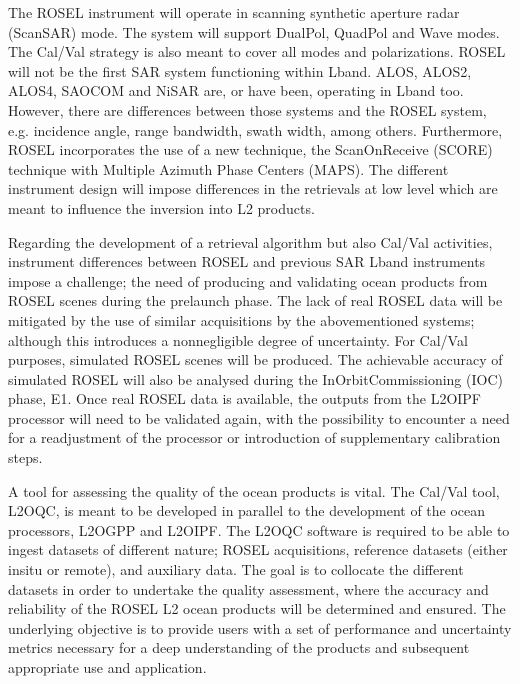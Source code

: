 \documentclass[a4paper,10pt,english]{sphinxmanual}
\begin{document}
\sphinxAtStartPar
The ROSE\sphinxhyphen{}L instrument will operate in scanning synthetic aperture radar (ScanSAR) mode. The system will support Dual\sphinxhyphen{}Pol, Quad\sphinxhyphen{}Pol and Wave modes. The Cal/Val strategy is also meant to cover all modes and polarizations. ROSE\sphinxhyphen{}L will not be the first SAR system functioning within L\sphinxhyphen{}band. ALOS, ALOS\sphinxhyphen{}2, ALOS\sphinxhyphen{}4, SAOCOM and NiSAR are, or have been, operating in L\sphinxhyphen{}band too. However, there are differences between those systems and the ROSE\sphinxhyphen{}L system, e.g. incidence angle, range bandwidth, swath width, among others. Furthermore, ROSE\sphinxhyphen{}L incorporates the use of a new technique, the Scan\sphinxhyphen{}On\sphinxhyphen{}Receive (SCORE) technique with Multiple Azimuth Phase Centers (MAPS). The different instrument design will impose differences in the retrievals at low level which are meant to influence the inversion into L2 products.

\sphinxAtStartPar
Regarding the development of a retrieval algorithm but also Cal/Val activities, instrument differences between ROSE\sphinxhyphen{}L and previous SAR L\sphinxhyphen{}band instruments impose a challenge; the need of producing and validating ocean products from ROSE\sphinxhyphen{}L scenes during the pre\sphinxhyphen{}launch phase. The lack of real ROSE\sphinxhyphen{}L data will be mitigated by the use of similar acquisitions by the above\sphinxhyphen{}mentioned systems; although this introduces a non\sphinxhyphen{}negligible degree of uncertainty. For Cal/Val purposes, simulated ROSE\sphinxhyphen{}L scenes will be produced. The achievable accuracy of simulated ROSE\sphinxhyphen{}L will also be analysed during the In\sphinxhyphen{}Orbit\sphinxhyphen{}Commissioning (IOC) phase, E1. Once real ROSE\sphinxhyphen{}L data is available, the outputs from the L2O\sphinxhyphen{}IPF processor will need to be validated again, with the possibility to encounter a need for a readjustment of the processor or introduction of supplementary calibration steps.

\sphinxAtStartPar
A tool for assessing the quality of the ocean products is vital. The Cal/Val tool, L2O\sphinxhyphen{}QC, is meant to be developed in parallel to the development of the ocean processors, L2O\sphinxhyphen{}GPP and L2O\sphinxhyphen{}IPF. The L2O\sphinxhyphen{}QC software is required to be able to ingest datasets of different nature; ROSE\sphinxhyphen{}L acquisitions, reference datasets (either in\sphinxhyphen{}situ or remote), and auxiliary data. The goal is to collocate the different datasets in order to undertake the quality assessment, where the accuracy and reliability of the ROSE\sphinxhyphen{}L L2 ocean products will be determined and ensured. The underlying objective is to provide users with a set of performance and uncertainty metrics necessary for a deep understanding of the products and subsequent appropriate use and application.
\end{document}
